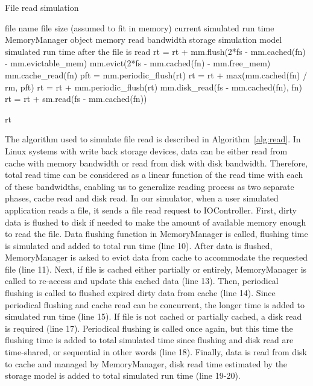 \documentclass[conference]{IEEEtran}
\newcommand{\Desc}[2]{\State \makebox[2em][l]{#1}#2}
\begin{document}
			\begin{algorithm}\caption{File read simulation}\label{alg:read}
				\small
				\begin{algorithmic}[1]
					\Input
        				\Desc{fn}{file name}
        				\Desc{fs}{file size (assumed to fit in memory)}
						\Desc{rt}{current simulated run time}
						\Desc{mm}{MemoryManager object}
						\Desc{rm}{memory read bandwidth}
						\Desc{sm}{storage simulation model}
   					\EndInput
   					\Output
						\Desc{rt}{simulated run time after the file is read}
   					\EndOutput
					\State rt = rt + mm.flush(2*fs - mm.cached(fn) - mm.evictable\_mem) 
					\State mm.evict(2*fs - mm.cached(fn) - mm.free\_mem) 
					  
    					\State mm.cache\_read(fn)  
    					\State pft = mm.periodic\_flush(rt) 
						\State rt = rt + max(mm.cached(fn) / rm, pft) 
					\EndIf
					 
						\State rt = rt + mm.periodic\_flush(rt) 
						\State mm.disk\_read(fs - mm.cached(fn), fn)
    					\State rt = rt + sm.read(fs - mm.cached(fn))
					\EndIf					
					
					\State \Return rt
					
				\end{algorithmic}
			\end{algorithm}			
			
			The algorithm used to simulate file read is described in 
			Algorithm~\ref{alg:read}. 
			In Linux systems with write back storage devices, data can be either read 
			from cache with memory bandwidth or read from disk with disk bandwidth. 
			Therefore, total read time can be considered as a linear function 
			of the read time with each of these bandwidths, 
			enabling us to generalize reading process as two separate phases, 
			cache read and disk read. 
			In our simulator, when a user simulated application reads a file, 
			it sends a file read request to IOController. 
			First, dirty data is flushed to disk if needed to make the amount of 
			available memory enough to read the file.
			Data flushing function in MemoryManager is called, flushing time is 
			simulated and added to total run time (line 10).
			After data is flushed, MemoryManager is asked to evict data 
			from cache to accommodate the requested file (line 11). 
			Next, if file is cached either partially or entirely, MemoryManager is 
			called to re-access and update this cached data (line 13). 
			Then, periodical flushing is called to flushed expired dirty data 
			from cache (line 14).
			Since periodical flushing and cache read can be concurrent, the longer 
			time is added to simulated run time (line 15).
			If file is not cached or partially cached, a disk read is required (line 17). 
			Periodical flushing is called once again, but this time the flushing time is 
			added to total simulated time since flushing and disk read are time-shared, 
			or sequential in other words (line 18).
			Finally, data is read from disk to cache and managed by MemoryManager, 
			disk read time estimated by the storage model is added to 
			total simulated run time (line 19-20). 
\end{document}
